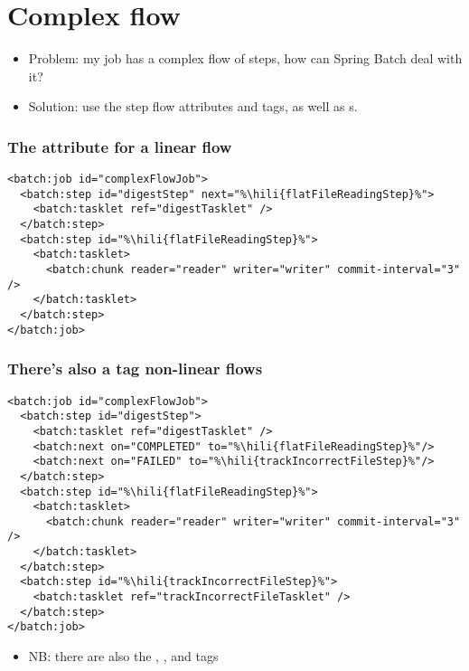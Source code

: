 \section{Complex flow}

\begin{frame}
 \begin{itemize}
  \item Problem: my job has a complex flow of steps, how can Spring Batch deal with it?
  \item Solution: use the step flow attributes and tags, as well as s.
 \end{itemize}
\end{frame}

\begin{frame}[fragile]
 \frametitle{The  attribute for a linear flow}
 \lstset{language=XML}
\begin{lstlisting}
<batch:job id="complexFlowJob">
  <batch:step id="digestStep" next="%\hili{flatFileReadingStep}%">
    <batch:tasklet ref="digestTasklet" />
  </batch:step>		
  <batch:step id="%\hili{flatFileReadingStep}%">
    <batch:tasklet>
      <batch:chunk reader="reader" writer="writer" commit-interval="3" />
    </batch:tasklet>		
  </batch:step>	
</batch:job>
\end{lstlisting}
\end{frame}

\begin{frame}[fragile]
 \frametitle{There's also a  tag non-linear flows}
 \lstset{language=XML}
\begin{lstlisting}
<batch:job id="complexFlowJob">
  <batch:step id="digestStep">
    <batch:tasklet ref="digestTasklet" />
    <batch:next on="COMPLETED" to="%\hili{flatFileReadingStep}%"/>
    <batch:next on="FAILED" to="%\hili{trackIncorrectFileStep}%"/>
  </batch:step>
  <batch:step id="%\hili{flatFileReadingStep}%">
    <batch:tasklet>
      <batch:chunk reader="reader" writer="writer" commit-interval="3" />
    </batch:tasklet>
  </batch:step>
  <batch:step id="%\hili{trackIncorrectFileStep}%">
    <batch:tasklet ref="trackIncorrectFileTasklet" />
  </batch:step>
</batch:job>
\end{lstlisting}
\begin{itemize}
 \item NB: there are also the , , and  tags
\end{itemize}

\end{frame}

